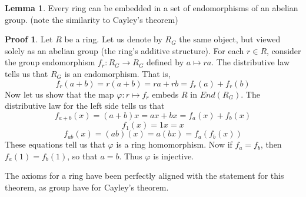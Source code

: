 \documentclass[12pt]{amsbook}
\theoremstyle{definition}
\newtheorem{lemma}[theorem]{Lemma}
\newtheorem*{prf}{Proof}
\begin{document}
\begin{lemma}
    Every ring can be embedded in a set of endomorphisms of an abelian group. (note the similarity to Cayley's theorem)
\end{lemma}
\begin{prf}
    Let $R$ be a ring. Let us denote by $R_G$ the same object, but viewed solely as an abelian group (the ring's additive structure). For each $r \in R$, consider the group endomorphism $f_r:R_G \to R_G$ defined by $a \mapsto ra$. The distributive law tells us that $R_G$ is an endomorphism. That is,
    \[ f_r(a + b) = r(a + b) = ra + rb = f_r(a) + f_r(b) \]
    Now let us show that the map $\varphi: r \mapsto f_r$ embeds $R$ in $End(R_G)$. The distributive law for the left side tells us that
    \[  f_{a + b}(x) = (a + b)x = ax + bx = f_a(x) + f_b(x) \]
    \[ f_{1}(x) = 1x = x \]
    \[ f_{ab}(x) = (ab)(x) = a(bx) = f_a(f_b(x)) \]
    These equations tell us that $\varphi$ is a ring homomorphism. Now if $f_a = f_b$, then $f_a(1) = f_b(1)$, so that $a = b$. Thus $\varphi$ is injective.
\end{prf}

The axioms for a ring have been perfectly aligned with the statement for this theorem, as group have for Cayley's theorem.
\end{document}
